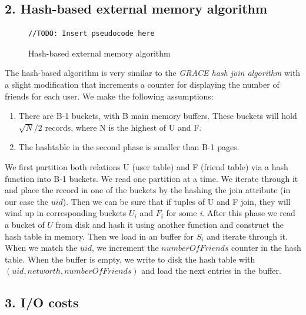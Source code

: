 \documentclass{article}      %
\begin{document}
\subsection* {2. Hash-based external memory algorithm}

\begin{figure}[htbp]
\begin{center}
\begin{lstlisting}
//TODO: Insert pseudocode here
\end{lstlisting}
\caption{Hash-based external memory algorithm}
\label{Hash-based external memory algorithm}
\end{center}
\end{figure}

The hash-based algorithm is very similar to the \emph{GRACE hash join algorithm} with a slight modification that increments a counter for displaying the number of friends for each user. We make the following assumptions:

\begin{enumerate}
\item 
There are B-1 buckets, with B main memory buffers. These buckets will hold \begin{math}\sqrt{N}/2\end{math} records, where N is the highest of U and F. 
\item
The hashtable in the second phase is smaller than B-1 pages.
\end{enumerate}

We first partition both relations U (user table) and F (friend table) via a hash function into B-1 buckets. We read one partition at a time. We iterate through it and place the record in one of the buckets by the hashing the join attribute (in our case the $uid$). Then we can be sure that if tuples of U and F join, they will wind up in corresponding buckets $U_i$ and $F_i$ for some \emph{i}. After this phase we read a bucket of $U$ from disk and hash it using another function and construct the hash table in memory. Then we load in an buffer for $S_i$ and iterate through it. When we match the $uid$, we increment the $numberOfFriends$ counter in the hash table. When the buffer is empty, we write to disk the hash table with $(uid, networth, numberOfFriends)$ and load the next entries in the buffer.\\

\subsection* {3. I/O costs}
\end{document}
